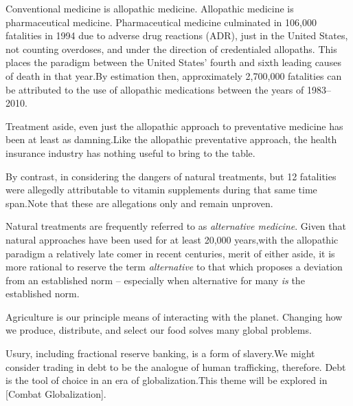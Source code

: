 Conventional medicine is allopathic medicine. Allopathic medicine is pharmaceutical medicine. Pharmaceutical medicine culminated in 106,000 fatalities in 1994 due to adverse drug reactions (ADR), just in the United States, not counting overdoses, and under the direction of credentialed allopaths. This places the paradigm between the United States' fourth and sixth leading causes of death in that year. By estimation then, approximately 2,700,000 fatalities can be attributed to the use of allopathic medications between the years of 1983--2010.\footnotecite[leape2000] 

Treatment aside, even just the allopathic approach to preventative medicine has been at least as damning. Like the allopathic preventative approach, the health insurance industry has nothing useful to bring to the table.

By contrast, in considering the dangers of natural treatments, but 12 fatalities were allegedly attributable to vitamin supplements during that same time span. Note that these are allegations only and remain unproven. 

Natural treatments are frequently referred to as {\it alternative medicine}. Given that natural approaches have been used for at least 20,000 years,\footnotecite[hardy2012] with the allopathic paradigm a relatively late comer in recent centuries, merit of either aside, it is more rational to reserve the term {\it alternative} to that which proposes a deviation from an established norm -- especially when alternative for many {\it is} the established norm.


Agriculture is our principle means of interacting with the planet. Changing how we produce, distribute, and select our food solves many global problems.\footnotecite[foodwaste]


Usury, including fractional reserve banking, is a form of slavery. We might consider trading in debt to be the analogue of human trafficking, therefore. Debt is the tool of choice in an era of globalization.\footnotecite[perkins2005] This theme will be explored in [Combat Globalization].


